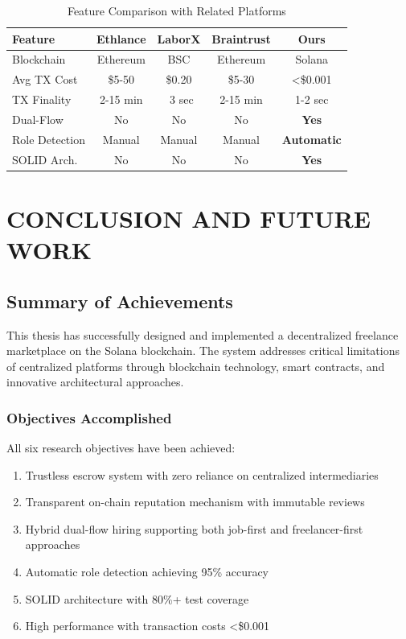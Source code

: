 \documentclass[a4paper,13pt,twoside]{report}
\theoremstyle{definition}
\begin{document}
\begin{table}[h]
\centering
\caption{Feature Comparison with Related Platforms}
\small
\begin{tabular}{|l|c|c|c|c|}
\hline
\textbf{Feature} & \textbf{Ethlance} & \textbf{LaborX} & \textbf{Braintrust} & \textbf{Ours} \\
\hline
Blockchain & Ethereum & BSC & Ethereum & Solana \\
Avg TX Cost & \$5-50 & \$0.20 & \$5-30 & <\$0.001 \\
TX Finality & 2-15 min & ~3 sec & 2-15 min & 1-2 sec \\
Dual-Flow & No & No & No & \textbf{Yes} \\
Role Detection & Manual & Manual & Manual & \textbf{Automatic} \\
SOLID Arch. & No & No & No & \textbf{Yes} \\
\hline
\end{tabular}
\end{table}

\newpage
\chapter{CONCLUSION AND FUTURE WORK}
\label{chapter:conclusion}

\section{Summary of Achievements}

This thesis has successfully designed and implemented a decentralized freelance marketplace on the Solana blockchain. The system addresses critical limitations of centralized platforms through blockchain technology, smart contracts, and innovative architectural approaches.

\subsection{Objectives Accomplished}

All six research objectives have been achieved:

\begin{enumerate}
    \item Trustless escrow system with zero reliance on centralized intermediaries
    \item Transparent on-chain reputation mechanism with immutable reviews
    \item Hybrid dual-flow hiring supporting both job-first and freelancer-first approaches
    \item Automatic role detection achieving 95\% accuracy
    \item SOLID architecture with 80\%+ test coverage
    \item High performance with transaction costs <\$0.001
\end{enumerate}
\end{document}
